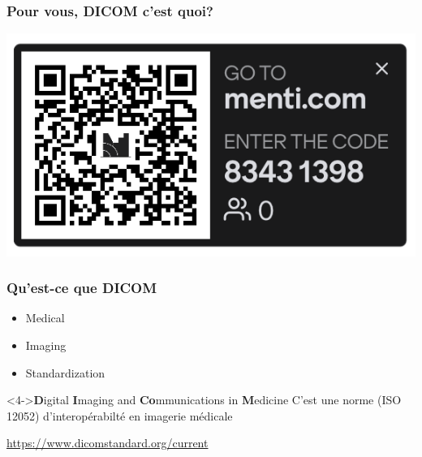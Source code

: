 
	\frame
	{
		\frametitle{Pour vous, DICOM c'est quoi?}

		\begin{center}
			\includegraphics[width=\linewidth]{../figures/menti.png}
		\end{center}
	}

	\frame
	{
		\frametitle{Qu'est-ce que DICOM}
		\begin{itemize}
			\item Medical
			\item<2-> Imaging
			\item<3-> Standardization
		\end{itemize}
		
		\begin{block}<4->{\textbf{D}igital \textbf{I}maging and \textbf{Co}mmunications in \textbf{M}edicine}
			C'est une norme (ISO 12052) d'interop\'erabilt\'e en imagerie m\'edicale
			
			\url{https://www.dicomstandard.org/current}
		\end{block}
	}
